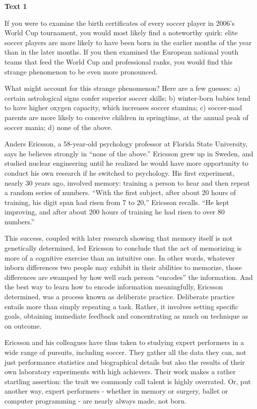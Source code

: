 \begin{center}\textbf{Text 1}\end{center}

\qquad If you were to examine the birth certificates of every soccer player in 2006’s World Cup tournament, you would most likely find a noteworthy quirk: elite soccer players are more likely to have been born in the earlier months of the year than in the later months. If you then examined the European national youth teams that feed the World Cup and professional ranks, you would find this strange phenomenon to be even more pronounced.

\qquad What might account for this strange phenomenon? Here are a few guesses: a) certain astrological signs confer superior soccer skills; b) winter-born babies tend to have higher oxygen capacity, which increases soccer stamina; c) soccer-mad parents are more likely to conceive children in springtime, at the annual peak of soccer mania; d) none of the above.

\qquad Anders Ericsson, a 58-year-old psychology professor at Florida State University, says he believes strongly in “none of the above.” Ericsson grew up in Sweden, and studied nuclear engineering until he realized he would have more opportunity to conduct his own research if he switched to psychology. His first experiment, nearly 30 years ago, involved memory: training a person to hear and then repeat a random series of numbers. “With the first subject, after about 20 hours of training, his digit span had risen from 7 to 20,” Ericsson recalls. “He kept improving, and after about 200 hours of training he had risen to over 80 numbers.”

\qquad This success, coupled with later research showing that memory itself is not genetically determined, led Ericsson to conclude that the act of memorizing is more of a cognitive exercise than an intuitive one. In other words, whatever inborn differences two people may exhibit in their abilities to memorize, those differences are swamped by how well each person “encodes” the information. And the best way to learn how to encode information meaningfully, Ericsson determined, was a process known as deliberate practice. Deliberate practice entails more than simply repeating a task. Rather, it involves setting specific goals, obtaining immediate feedback and concentrating as much on technique as on outcome.

\qquad Ericsson and his colleagues have thus taken to studying expert performers in a wide range of pursuits, including soccer. They gather all the data they can, not just performance statistics and biographical details but also the results of their own laboratory experiments with high achievers. Their work makes a rather startling assertion: the trait we commonly call talent is highly overrated. Or, put another way, expert performers - whether in memory or surgery, ballet or computer programming - are nearly always made, not born.


